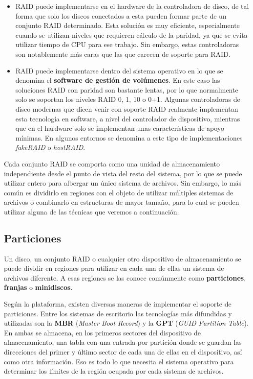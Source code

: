 \begin{itemize}
\item
  RAID puede implementarse en el hardware de la controladora de disco,
  de tal forma que solo los discos conectados a esta pueden formar parte
  de un conjunto RAID determinado. Esta solución es muy eficiente,
  especialmente cuando se utilizan niveles que requieren cálculo de la
  paridad, ya que se evita utilizar tiempo de CPU para ese trabajo. Sin
  embargo, estas controladoras son notablemente más caras que las que
  carecen de soporte para RAID.
\item
  RAID puede implementarse dentro del sistema operativo en lo que se
  denomina el \textbf{software de gestión de volúmenes}{}. En este caso
  las soluciones RAID con paridad son bastante lentas, por lo que
  normalmente solo se soportan los niveles RAID 0, 1, 10 o 0+1. Algunas
  controladoras de disco modernas que dicen venir con soporte RAID
  realmente implementan esta tecnología en software, a nivel del
  controlador de dispositivo, mientras que en el hardware solo se
  implementan unas características de apoyo mínimas. En algunos entornos
  se denomina a este tipo de implementaciones \emph{fakeRAID} o
  \emph{hostRAID}.
\end{itemize}

Cada conjunto RAID se comporta como una unidad de almacenamiento
independiente desde el punto de vista del resto del sistema, por lo que
se puede utilizar entero para albergar un único sistema de archivos. Sin
embargo, lo más común es dividirlo en regiones con el objeto de utilizar
múltiples sistemas de archivos o combinarlo en estructuras de mayor
tamaño, para lo cual se pueden utilizar alguna de las técnicas que
veremos a continuación.

\subsection{Particiones}\label{_particiones}

Un disco, un conjunto RAID o cualquier otro dispositivo de
almacenamiento se puede dividir en regiones para utilizar en cada una de
ellas un sistema de archivos diferente. A esas regiones se las conoce
comúnmente como \textbf{{}particiones}, \textbf{{}franjas} o
\textbf{{}minidiscos}.

Según la plataforma, existen diversas maneras de implementar el soporte
de particiones. Entre los sistemas de escritorio las tecnologías más
difundidas y utilizadas son la \textbf{MBR} (\emph{Master Boot Record})
y la \textbf{GPT} (\emph{GUID Partition Table}). En ambas se almacena,
en los primeros sectores del dispositivo de almacenamiento, una tabla
con una entrada por partición donde se guardan las direcciones del
primer y último sector de cada una de ellas en el dispositivo, así como
otra información. Eso es todo lo que necesita el sistema operativo para
determinar los límites de la región ocupada por cada sistema de
archivos.

